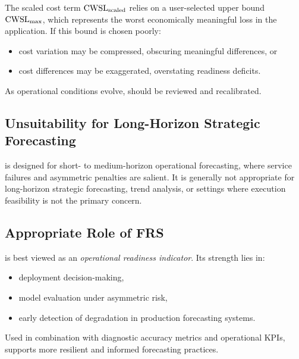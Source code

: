 The scaled cost term \(\mathrm{CWSL}_{\mathrm{scaled}}\) relies on a user-selected upper bound
\(\mathrm{CWSL}_{\max}\), which represents the worst economically meaningful loss in the
application. If this bound is chosen poorly:

\begin{itemize}
    \item cost variation may be compressed, obscuring meaningful differences, or
    \item cost differences may be exaggerated, overstating readiness deficits.
\end{itemize}

As operational conditions evolve, \CWSLmax{} should be reviewed and recalibrated.

\subsection{Unsuitability for Long-Horizon Strategic Forecasting}

\FRS{} is designed for short- to medium-horizon operational forecasting, where
service failures and asymmetric penalties are salient. It is generally not
appropriate for long-horizon strategic forecasting, trend analysis, or settings
where execution feasibility is not the primary concern.

\subsection{Appropriate Role of FRS}

\FRS{} is best viewed as an \emph{operational readiness indicator}. Its strength
lies in:

\begin{itemize}
    \item deployment decision-making,
    \item model evaluation under asymmetric risk,
    \item early detection of degradation in production forecasting systems.
\end{itemize}

Used in combination with diagnostic accuracy metrics and operational KPIs, \FRS{}
supports more resilient and informed forecasting practices.

